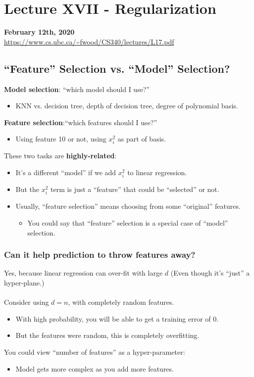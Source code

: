 \documentclass{article}
\def\blu#1{{\color{blu}#1}}
\def\gre#1{{\color{gre}#1}}
\def\red#1{{\color{red}#1}}
\theoremstyle{definition}
\begin{document}
\section*{Lecture XVII - Regularization}
\textbf{February 12th, 2020} \\
\url{https://www.cs.ubc.ca/~fwood/CS340/lectures/L17.pdf}

\subsection*{“Feature” Selection vs. “Model” Selection?}
\blu{\textbf{Model selection}}: “which model should I use?”
\begin{itemize}
	\item KNN vs. decision tree, depth of decision tree, \gre{degree of polynomial basis}. 
\end{itemize}
\blu{\textbf{Feature selection}}:“which features should I use?”
\begin{itemize}
	\item Using feature 10 or not, \gre{using $ x_i^2 $ as part of basis}.
\end{itemize}
These two tasks are \gre{\textbf{highly-related}}:
\begin{itemize}
	\item It’s a different “model” if we add $ x_i^2 $ to linear regression.
	\item But the $ x_i^2 $ term is just a “feature” that could be “selected” or not.
	\item Usually, “feature selection” means choosing from some “original” features. 
	\begin{itemize}
		\item You could say that “feature” selection is a special case of “model” selection.
	\end{itemize}
\end{itemize}

\subsubsection*{Can it help prediction to throw features away?}
Yes, because \red{linear regression can over-fit} with large $ d $ (Even though it’s “just” a hyper-plane.) \\ \\
Consider using $ d = n $, with completely random features. 
\begin{itemize}
	\item With high probability, you will be able to \red{get a training error of 0}. 
	\item But the features were random, this is \red{completely overfitting}.
\end{itemize}
You could view \gre{“number of features” as a hyper-parameter}:
\begin{itemize}
	\item Model gets more complex as you add more features.
\end{itemize}
\end{document}
